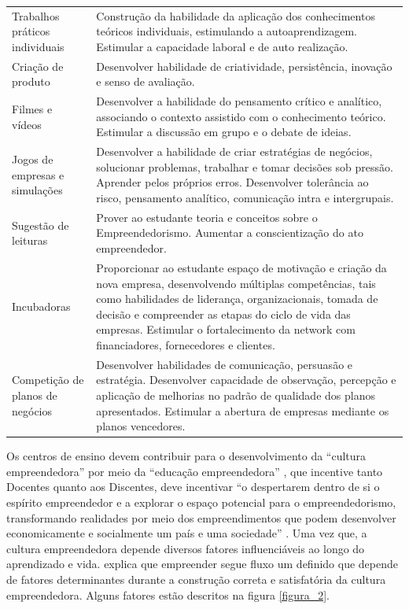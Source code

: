 \begin{center}
\begin{longtable}{p{3.5cm}p{11.0cm}}
Trabalhos práticos individuais & Construção da habilidade da aplicação dos conhecimentos teóricos
individuais, estimulando a autoaprendizagem. Estimular a capacidade
laboral e de auto realização. \\ 

Criação de produto & Desenvolver habilidade de criatividade, persistência, inovação e senso de
avaliação. \\ 

Filmes e vídeos & Desenvolver a habilidade do pensamento crítico e analítico, associando o
contexto assistido com o conhecimento teórico. Estimular a discussão em grupo e o debate de ideias. \\ 

Jogos de empresas e simulações & Desenvolver a habilidade de criar estratégias de negócios, solucionar
problemas, trabalhar e tomar decisões sob pressão. Aprender pelos próprios erros. Desenvolver tolerância ao risco, pensamento analítico, comunicação intra e intergrupais. \\ 

Sugestão de leituras & Prover ao estudante teoria e conceitos sobre o Empreendedorismo. Aumentar a conscientização do ato empreendedor. \\ 
Incubadoras & Proporcionar ao estudante espaço de motivação e criação da nova empresa, desenvolvendo múltiplas competências, tais como habilidades de liderança, organizacionais, tomada de decisão e compreender as etapas do ciclo de vida das empresas. Estimular o fortalecimento da network com financiadores, fornecedores e clientes. \\

Competição de planos de negócios & Desenvolver habilidades de comunicação, persuasão e estratégia.
Desenvolver capacidade de observação, percepção e aplicação de melhorias no padrão de qualidade dos planos apresentados. Estimular a abertura de empresas mediante os planos vencedores. \\ 

\end{longtable}
\renewcommand\LTcaptype{quadro}
\end{center}



Os centros de ensino devem contribuir para o desenvolvimento da “cultura empreendedora” por meio da “educação empreendedora” \cite{tscha_empreendendo_2014}, que incentive tanto Docentes quanto aos Discentes, deve incentivar “o despertarem dentro de si o espírito empreendedor e a explorar o espaço potencial para o empreendedorismo, transformando realidades por meio dos empreendimentos que podem desenvolver economicamente e socialmente um país e uma sociedade” \cite{tscha_empreendendo_2014}. Uma vez que, a cultura empreendedora depende diversos fatores influenciáveis ao longo do aprendizado e vida. \cite{dornelas_empreendedorismo:_2005} explica que  empreender segue fluxo um definido que depende de fatores determinantes durante a construção correta e satisfatória da cultura empreendedora. Alguns fatores estão descritos na figura \ref{figura_2}.


